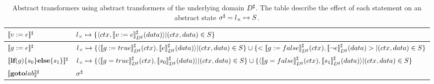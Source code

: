 \begin{table*}
\footnotesize
\begin{tabular}{ll}
\hline
$\lbrack\!\lbrack v:=e \rbrack\!\rbrack^{\sharp}$ & $l_{\times} \mapsto \{\langle ctx,\lbrack\!\lbrack v:=e \rbrack\!\rbrack^{\sharp}_{D^\sharp}(data) \rangle | (ctx,data) \in S \}$ \\
\hline
$\lbrack\!\lbrack g:=e \rbrack\!\rbrack^{\sharp}$ & $l_{\times} \mapsto \{\langle \asemp{g:=true}_{\A{D}}(ctx),\asemp{e}_{\A{D}}(data) \rangle  | (ctx,data) \in S \} \cup \{ <\asemp{g:=false}_{\A{D}}(ctx),\asemp{\neg e}_{\A{D}}(data)> | (ctx,data) \in S \}$ \\
\hline
$\lbrack\!\lbrack \textbf{if} (g) \{s_{0}\} \textbf{else} \{s_{1}\} \rbrack\!\rbrack^{\sharp}$ & $l_{\times} \mapsto \{\langle\asemp{g=true}_{\A{D}}(ctx),  \asemp{s_0}_{\A{D}}(data) \rangle | (ctx,data) \in S \} \cup \{\langle \asemp{g=false}_{\A{D}}(ctx), \asemp{s_1}_{\A{D}}(data) \rangle | (ctx,data) \in S \}$ \\
\hline
$\lbrack\!\lbrack \textbf{goto} lab \rbrack\!\rbrack^{\sharp}$ & $\sigma^\sharp$ \\
\hline
\end{tabular}
\caption{Abstract transformers using abstract transformers of the underlying domain $D^\sharp$. The table describe the effect of each statement on an abstract state $\sigma^\sharp = l_{\times} \mapsto S$.}\label{Ta:AbsTrans}
\end{table*}